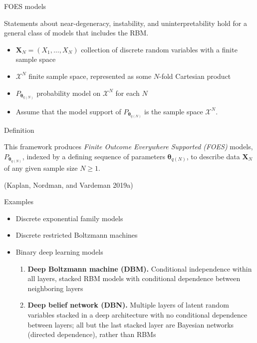 \documentclass[ignorenonframetext,]{beamer}
\providecommand{\tightlist}{%
  \setlength{\itemsep}{0pt}\setlength{\parskip}{0pt}}
\theoremstyle{definition}
\newcommand{\thetaN}{\boldsymbol \theta_{\thetaidx}}
\newcommand{\thetaidx}{q(N)}
\begin{document}
\begin{frame}{FOES models}
\protect\hypertarget{foes-models}{}

Statements about near-degeneracy, instability, and uninterpretability
hold for a general class of models that includes the RBM.

\begin{itemize}
\item
  \(\boldsymbol X_N = (X_1, \dots, X_N)\) collection of discrete random
  variables with a finite sample space
\item
  \(\mathcal{X}^N\) finite sample space, represented as some \(N\)-fold
  Cartesian product
\item
  \(P_{{\thetaN}}\) probability model on \(\mathcal{X}^N\) for each
  \(N\)
\item
  Assume that the model support of \(P_{{\thetaN}}\) is the sample space
  \(\mathcal{X}^N\).
\end{itemize}

\begin{block}{Definition}

This framework produces \emph{Finite Outcome Everywhere Supported
(FOES)} models, \(P_{{\thetaN}}\), indexed by a defining sequence of
parameters \({\thetaN}\), to describe data \(\boldsymbol X_N\) of any
given sample size \(N \geq 1\).

(Kaplan, Nordman, and Vardeman 2019a)

\end{block}

\end{frame}

\begin{frame}{Examples}
\protect\hypertarget{examples}{}

\begin{itemize}
\item
  Discrete exponential family models
\item
  Discrete restricted Boltzmann machines
\item
  Binary deep learning models

  \vspace{.1in}

  \begin{enumerate}
  \tightlist
  \item
    \textbf{Deep Boltzmann machine (DBM).} Conditional independence
    within all layers, stacked RBM models with conditional dependence
    between neighboring layers
  \end{enumerate}

  \vspace{.1in}

  \begin{enumerate}
  \setcounter{enumi}{1}
  \tightlist
  \item
    \textbf{Deep belief network (DBN).} Multiple layers of latent random
    variables stacked in a deep architecture with no conditional
    dependence between layers; all but the last stacked layer are
    Bayesian networks (directed dependence), rather than RBMs
  \end{enumerate}
\end{itemize}

\end{frame}
\end{document}
